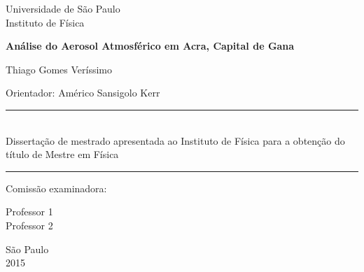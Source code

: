 \begin{titlepage}
\setlength{\voffset}{0pt}
\setlength{\hoffset}{0pt}
\centering
\Large{Universidade de São Paulo \\
Instituto de Física}


\LARGE{\bf Análise do Aerosol Atmosférico em Acra, Capital de Gana
}


\Large{ Thiago Gomes Veríssimo
}


\begin{flushright}

\begin{minipage}{.6\textwidth}
\large{Orientador: Américo Sansigolo Kerr
}
\end{minipage}


\begin{minipage}{.6\textwidth}
\rule{\linewidth}{0.5mm}\\
\large{
Dissertação de mestrado apresentada ao Instituto de Física para a obtenção do 
título de Mestre em Física
}

\rule{\linewidth}{0.5mm}
\end{minipage}
\end{flushright}


\begin{flushleft}

\normalsize
Comissão examinadora:\\
\hspace{.03\textwidth}\begin{minipage}{.97\textwidth}
Professor 1 \\
Professor 2
\end{minipage}
\end{flushleft}


São Paulo\\
2015

\end{titlepage}


